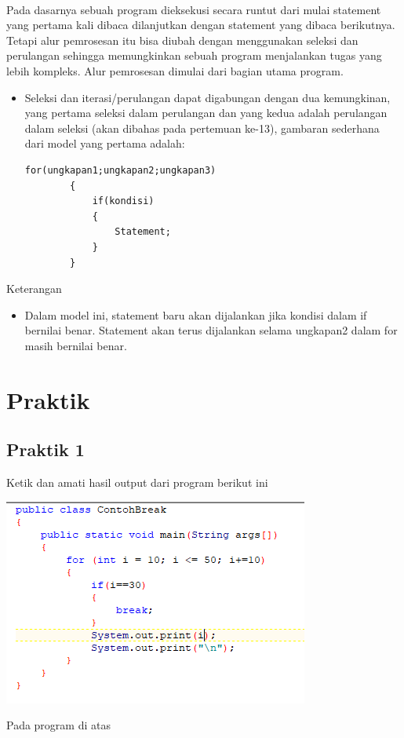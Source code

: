 \documentclass[a4paper,12pt]{article}
\begin{document}
\paragraph{}
Pada dasarnya sebuah program dieksekusi secara runtut dari mulai statement yang
pertama kali dibaca dilanjutkan dengan statement yang dibaca berikutnya.
Tetapi alur pemrosesan itu bisa diubah dengan menggunakan seleksi dan
perulangan sehingga memungkinkan sebuah program menjalankan tugas yang lebih
kompleks.
Alur pemrosesan dimulai dari bagian utama program.
\begin{itemize}[label=*.] 
    \item Seleksi dan iterasi/perulangan dapat digabungan dengan dua kemungkinan,
    yang pertama seleksi dalam perulangan dan yang kedua adalah perulangan
    dalam seleksi (akan dibahas pada pertemuan ke-13), gambaran sederhana dari
    model yang pertama adalah:
    \begin{lstlisting}[frame=single]
        for(ungkapan1;ungkapan2;ungkapan3)
        {
            if(kondisi)
            {
                Statement;
            }
        }
    \end{lstlisting}
\end{itemize}
Keterangan
\begin{itemize}[label=*.]
    \item Dalam model ini, statement baru akan dijalankan jika kondisi dalam if bernilai
benar. Statement akan terus dijalankan selama ungkapan2 dalam for masih
bernilai benar.
\end{itemize}
\newpage
\section{Praktik}
\subsection{Praktik 1}
Ketik dan amati hasil output dari program berikut ini\\
\begin{center}
    \includegraphics[scale=1]{image1}
\end{center}
Pada program di atas 
\end{document}
